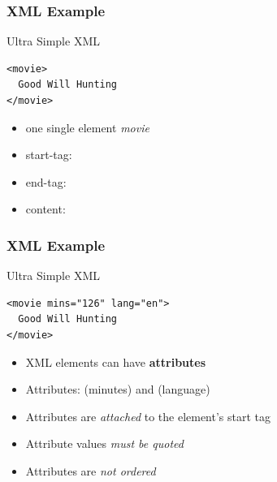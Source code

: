 \documentclass[svgnames]{beamer}
\begin{document}

\begin{frame}[fragile]
\frametitle{XML Example}

\begin{block}{Ultra Simple XML}
\begin{verbatim}
<movie>
  Good Will Hunting
</movie>
\end{verbatim}
\end{block}

\bigskip

\begin{itemize}
 \item one single element {\textit{movie}}
 \item start-tag: {\hilit {}}
 \item end-tag: {\hilit {}}
 \item content: 
\end{itemize}

\end{frame}


\begin{frame}[fragile]
\frametitle{XML Example}

\begin{block}{Ultra Simple XML}
\begin{verbatim}
<movie mins="126" lang="en">
  Good Will Hunting
</movie>
\end{verbatim}
\end{block}

\bigskip

\begin{itemize}
 \item XML elements can have \textbf{attributes}
 \item Attributes:   (minutes) and  (language)
 \item Attributes are \textit{attached} to the element's start tag
 \item Attribute values \emph{must be quoted}
 \item Attributes are \emph{not ordered}
\end{itemize}

\end{frame}

\end{document}
